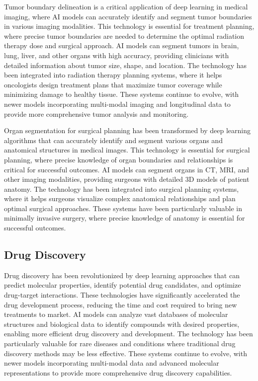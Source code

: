 Tumor boundary delineation is a critical application of deep learning in medical imaging, where AI models can accurately identify and segment tumor boundaries in various imaging modalities. This technology is essential for treatment planning, where precise tumor boundaries are needed to determine the optimal radiation therapy dose and surgical approach. AI models can segment tumors in brain, lung, liver, and other organs with high accuracy, providing clinicians with detailed information about tumor size, shape, and location. The technology has been integrated into radiation therapy planning systems, where it helps oncologists design treatment plans that maximize tumor coverage while minimizing damage to healthy tissue. These systems continue to evolve, with newer models incorporating multi-modal imaging and longitudinal data to provide more comprehensive tumor analysis and monitoring.

Organ segmentation for surgical planning has been transformed by deep learning algorithms that can accurately identify and segment various organs and anatomical structures in medical images. This technology is essential for surgical planning, where precise knowledge of organ boundaries and relationships is critical for successful outcomes. AI models can segment organs in CT, MRI, and other imaging modalities, providing surgeons with detailed 3D models of patient anatomy. The technology has been integrated into surgical planning systems, where it helps surgeons visualize complex anatomical relationships and plan optimal surgical approaches. These systems have been particularly valuable in minimally invasive surgery, where precise knowledge of anatomy is essential for successful outcomes.

\subsection{Drug Discovery}

Drug discovery has been revolutionized by deep learning approaches that can predict molecular properties, identify potential drug candidates, and optimize drug-target interactions. These technologies have significantly accelerated the drug development process, reducing the time and cost required to bring new treatments to market. AI models can analyze vast databases of molecular structures and biological data to identify compounds with desired properties, enabling more efficient drug discovery and development. The technology has been particularly valuable for rare diseases and conditions where traditional drug discovery methods may be less effective. These systems continue to evolve, with newer models incorporating multi-modal data and advanced molecular representations to provide more comprehensive drug discovery capabilities.

